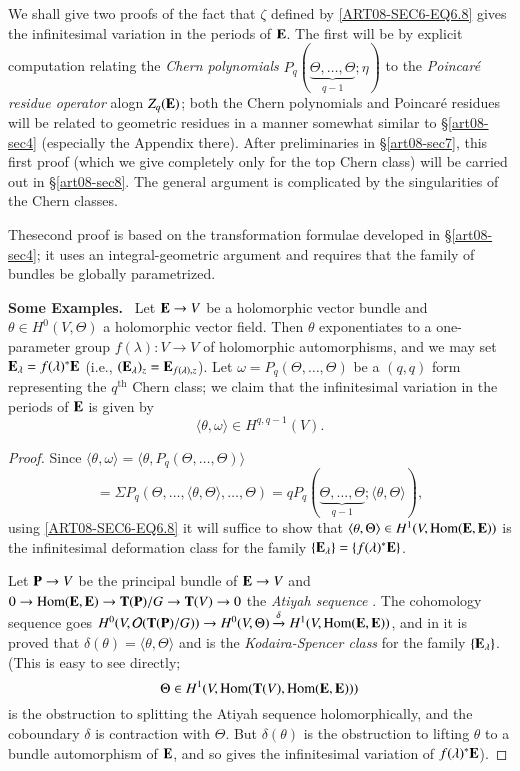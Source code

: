 We shall give two proofs of the fact that $\zeta$ defined by \eqref{ART08-SEC6-EQ6.8} gives the infinitesimal variation in the periods of $\mathbf{E}$. The first will be by explicit computation relating the {\em Chern polynomials} $P_{q}(\underbrace{\Theta,\ldots,\Theta}_{q-1};\eta)$ to the {\em Poincar\'e residue operator} alogn $Z_{q}(\mathbf{E})$; both the Chern polynomials and Poincar\'e residues will be related to geometric residues in a manner somewhat similar to \S\ref{art08-sec4} (especially the Appendix there). After preliminaries in \S\ref{art08-sec7}, this first proof (which we give completely only for the top Chern class) will be carried out in \S\ref{art08-sec8}. The general argument is complicated by the singularities of the Chern classes.

The\pageoriginale second proof is based on the transformation formulae developed in \S\ref{art08-sec4}; it uses an integral-geometric argument and requires that the family of bundles be globally parametrized.

\medskip
\noindent
{\bf Some Examples.}~ Let $\mathbf{E}\to V$ be a holomorphic vector bundle and $\theta\in H^{0}(V,\Theta)$ a holomorphic vector field. Then $\theta$ exponentiates to a one-parameter group $f(\lambda):V\to V$ of holomorphic automorphisms, and we may set $\mathbf{E}_{\lambda}=f(\lambda)^{*}\mathbf{E}$ (i.e., $(\mathbf{E}_{\lambda})_{z}=\mathbf{E}_{f(\lambda),z}$). Let $\omega=P_{q}(\Theta,\ldots,\Theta)$ be a $(q,q)$ form representing the $q^{\text{th}}$ Chern class; we claim that the infinitesimal variation in the periods of $\mathbf{E}$ is given by
\begin{equation}
\langle \theta,\omega\rangle \in H^{q,q-1}(V).\label{art08-sec6-eq6.9}
\end{equation}

\begin{proof}
Since $\langle \theta,\omega\rangle=\langle \theta, P_{q}(\Theta,\ldots,\Theta)\rangle$
$$
=\Sigma P_{q}(\Theta,\ldots,\langle \theta,\Theta\rangle,\ldots,\Theta)=qP_{q}(\underbrace{\Theta,\ldots,\Theta}_{q-1};\langle \theta,\Theta\rangle),
$$
using \eqref{ART08-SEC6-EQ6.8} it will suffice to show that $\langle \theta,\Theta\rangle\in H^{1}(V,\operatorname{\mathrm{Hom}}(\mathbf{E},\mathbf{E}))$ is the infinitesimal deformation class for the family $\{\mathbf{E}_{\lambda}\}=\{f(\lambda)^{*}\mathbf{E}\}$. 

Let $\mathbf{P}\to V$ be the principal bundle of $\mathbf{E}\to V$ and $0\to \Hom(\bfE,\bfE)\break \to \bfT(\bfP)/G\to \bfT(V)\to 0$ the {\em Atiyah sequence} \cite{art08-key1}. The cohomology sequence goes $H^{0}(V,\mathcal{O}(\mathbf{T}(\mathbf{P})/G))\to H^{0}(V,\Theta)\xrightarrow{\delta} H^{1}(V,\operatorname{\mathrm{Hom}}(\mathbf{E},\mathbf{E}))$, and in \cite{art08-key8} it is proved that $\delta(\theta)=\langle \theta,\Theta\rangle$ and is the {\em Kodaira-Spencer class} for the family $\{\mathbf{E}_{\lambda}\}$. (This is easy to see directly; 
$$
\Theta\in H^{1}(V,\operatorname{\mathrm{Hom}}(\mathbf{T}(V),\operatorname{\mathrm{Hom}}(\mathbf{E},\mathbf{E})))
$$ 
is the obstruction to splitting the Atiyah sequence holomorphically, and the coboundary $\delta$ is contraction with $\Theta$. But $\delta(\theta)$ is the obstruction to lifting $\theta$ to a bundle automorphism of $\mathbf{E}$, and so gives the infinitesimal variation of $f(\lambda)^{*}\mathbf{E}$).
\end{proof}


